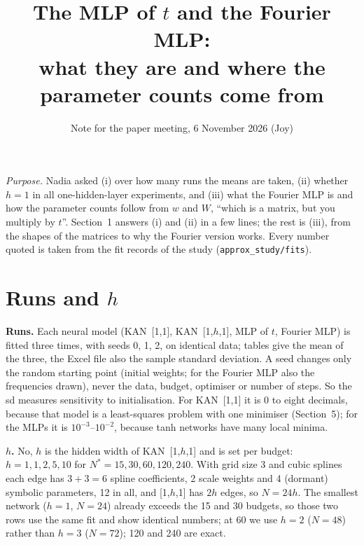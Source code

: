 \documentclass[11pt,a4paper]{article}
\title{\vspace{-1.2cm}The MLP of $t$ and the Fourier MLP:\\ what they are and where the parameter counts come from}
\author{Note for the paper meeting, 6 November 2026 (Joy)}
\date{}
\begin{document}
\maketitle
\vspace{-0.8cm}
\noindent\textit{Purpose.} Nadia asked (i) over how many runs the means are taken, (ii) whether $h=1$ in all one-hidden-layer experiments, and (iii) what the Fourier MLP is and how the parameter counts follow from $w$ and $W$, ``which is a matrix, but you multiply by $t$''. Section~1 answers (i) and (ii) in a few lines; the rest is (iii), from the shapes of the matrices to why the Fourier version works. Every number quoted is taken from the fit records of the study (\texttt{approx\_study/fits}).

\section{Runs and $h$}
\textbf{Runs.} Each neural model (KAN~[1,1], KAN~[1,$h$,1], MLP of $t$, Fourier MLP) is fitted three times, with seeds 0, 1, 2, on identical data; tables give the mean of the three, the Excel file also the sample standard deviation. A seed changes only the random starting point (initial weights; for the Fourier MLP also the frequencies drawn), never the data, budget, optimiser or number of steps. So the sd measures sensitivity to initialisation. For KAN~[1,1] it is $0$ to eight decimals, because that model is a least-squares problem with one minimiser (Section~5); for the MLPs it is $10^{-3}$--$10^{-2}$, because tanh networks have many local minima.

\textbf{$h$.} No, $h$ is the hidden width of KAN~[1,$h$,1] and is set per budget: $h=1,1,2,5,10$ for $N^*=15,30,60,120,240$. With grid size 3 and cubic splines each edge has $3+3=6$ spline coefficients, 2 scale weights and 4 (dormant) symbolic parameters, 12 in all, and [1,$h$,1] has $2h$ edges, so $N=24h$. The smallest network ($h=1$, $N=24$) already exceeds the 15 and 30 budgets, so those two rows use the same fit and show identical numbers; at 60 we use $h=2$ ($N=48$) rather than $h=3$ ($N=72$); 120 and 240 are exact.
\end{document}
